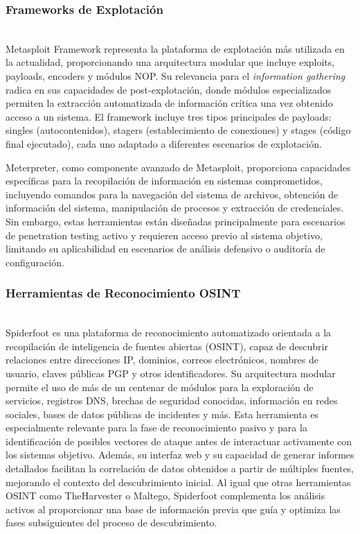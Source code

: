 \documentclass[runningheads]{llncs}
\begin{document}
\subsubsection{Frameworks de Explotación}
\hfill\\

Metasploit Framework representa la plataforma de explotación más utilizada en la actualidad, proporcionando una arquitectura modular que incluye exploits, payloads, encoders y módulos NOP. Su relevancia para el \textit{information gathering} radica en sus capacidades de post-explotación, donde módulos especializados permiten la extracción automatizada de información crítica una vez obtenido acceso a un sistema. El framework incluye tres tipos principales de payloads: singles (autocontenidos), stagers (establecimiento de conexiones) y stages (código final ejecutado), cada uno adaptado a diferentes escenarios de explotación.

Meterpreter, como componente avanzado de Metasploit, proporciona capacidades específicas para la recopilación de información en sistemas comprometidos, incluyendo comandos para la navegación del sistema de archivos, obtención de información del sistema, manipulación de procesos y extracción de credenciales. Sin embargo, estas herramientas están diseñadas principalmente para escenarios de penetration testing activo y requieren acceso previo al sistema objetivo, limitando su aplicabilidad en escenarios de análisis defensivo o auditoría de configuración.

\subsubsection{Herramientas de Reconocimiento OSINT}
\hfill\\

Spiderfoot es una plataforma de reconocimiento automatizado orientada a la recopilación de inteligencia de fuentes abiertas (OSINT), capaz de descubrir relaciones entre direcciones IP, dominios, correos electrónicos, nombres de usuario, claves públicas PGP y otros identificadores. Su arquitectura modular permite el uso de más de un centenar de módulos para la exploración de servicios, registros DNS, brechas de seguridad conocidas, información en redes sociales, bases de datos públicas de incidentes y más. Esta herramienta es especialmente relevante para la fase de reconocimiento pasivo y para la identificación de posibles vectores de ataque antes de interactuar activamente con los sistemas objetivo. Además, su interfaz web y su capacidad de generar informes detallados facilitan la correlación de datos obtenidos a partir de múltiples fuentes, mejorando el contexto del descubrimiento inicial. Al igual que otras herramientas OSINT como TheHarvester o Maltego, Spiderfoot complementa los análisis activos al proporcionar una base de información previa que guía y optimiza las fases subsiguientes del proceso de descubrimiento.
\end{document}

